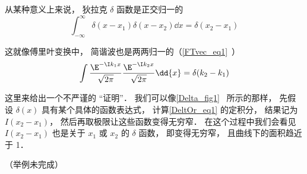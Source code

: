 

从某种意义上来说， 狄拉克 $\delta$ 函数是正交归一的
\begin{equation}\label{DeltOr_eq1}
\int_{-\infty}^{\infty}\delta(x - x_1) \delta(x - x_2) \dd{x} = \delta(x_2 - x_1)
\end{equation}

这就像傅里叶变换中， 简谐波也是两两归一的（\autoref{FTvec_eq1}~）
\begin{equation}
\int \frac{\E^{-\I k_1 x}}{\sqrt{2\pi }} \frac{\E^{-\I k_2 x}}{\sqrt{2\pi }} \dd{x} = \delta (k_2 - k_1)
\end{equation}

这里来给出一个不严谨的 “证明”． 我们可以像\autoref{Delta_fig1}~ 所示的那样， 先假设 $\delta(x)$ 具有某个具体的函数表达式， 计算\autoref{DeltOr_eq1} 的定积分， 结果记为 $I(x_2 - x_1)$， 然后再取极限让这些函数变得无穷窄． 在这个过程中我们会看见 $I(x_2 - x_1)$ 也是关于 $x_1$ 或 $x_2$ 的 $\delta$ 函数， 即变得无穷窄， 且曲线下的面积趋近于 1．

（举例未完成）

